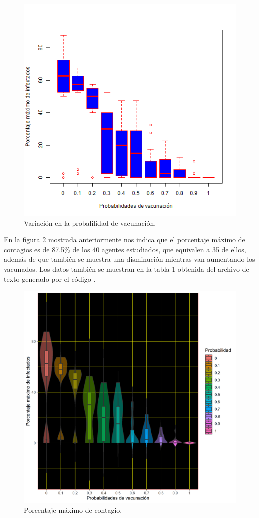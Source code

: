 \documentclass{article}
\begin{document}
\begin{figure}
  \centering\includegraphics[scale=0.7]{tareaseisboxplot.png}
  \caption{Variaci\'on en la probalilidad de vacunaci\'on.}
  \label{fig}
\end{figure}

\newpage
En la figura 2 mostrada anteriormente nos indica que el porcentaje m\'aximo de contagios es de 87.5\% de los 40 agentes estudiados, que equivalen a 35 de ellos, adem\'as de que tambi\'en se muestra una disminuci\'on mientras van aumentando los vacunados. Los datos tambi\'en se muestran en la tabla 1 obtenida del archivo de texto generado por el c\'odigo \cite{yo}.

\begin{figure}
  \centering\includegraphics[scale=0.7]{Tareaseisvacunas.png}
  \caption{Porcentaje m\'aximo de contagio.}
  \label{fig}
\end{figure}
\end{document}
